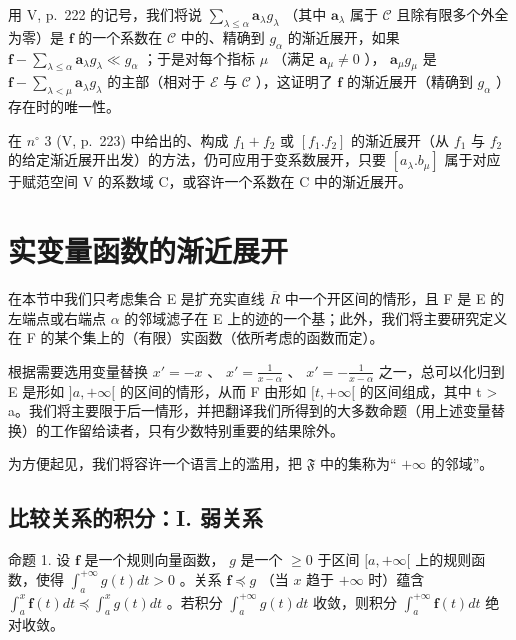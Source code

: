 用 V, p.~222 的记号，我们将说 \(\sum_{\lambda \leqslant \alpha} \mathbf{a}_{\lambda} g_{\lambda}\) （其中 \(\mathbf{a}_{\lambda}\) 属于 \(\mathcal{C}\) 且除有限多个外全为零）是 \(\mathbf{f}\) 的一个系数在 \(\mathcal{C}\) 中的、精确到 \(g_{\alpha}\) 的渐近展开，如果 \(\mathbf{f} - \sum_{\lambda \leqslant \alpha} \mathbf{a}_{\lambda} g_{\lambda} \ll g_{\alpha}\) ；于是对每个指标 \(\mu\) （满足 \(\mathbf{a}_{\mu} \neq 0\) ）， \(\mathbf{a}_{\mu} g_{\mu}\) 是 \(\mathbf{f} - \sum_{\lambda < \mu} \mathbf{a}_{\lambda} g_{\lambda}\) 的主部（相对于 \(\mathcal{E}\) 与 \(\mathcal{C}\) ），这证明了 \(\mathbf{f}\) 的渐近展开（精确到 \(g_{\alpha}\) ）存在时的唯一性。

在 \(n^{\circ}\) 3 (V, p.~223) 中给出的、构成 \(f_{1} + f_{2}\) 或 \([f_{1}.f_{2}]\) 的渐近展开（从 \(f_{1}\) 与 \(f_{2}\) 的给定渐近展开出发）的方法，仍可应用于变系数展开，只要 \([a_{\lambda}.b_{\mu}]\) 属于对应于赋范空间 V 的系数域 C，或容许一个系数在 C 中的渐近展开。

\section{实变量函数的渐近展开}

在本节中我们只考虑集合 E 是扩充实直线 \(\overline{R}\) 中一个开区间的情形，且 F 是 E 的左端点或右端点 \(\alpha\) 的邻域滤子在 E 上的迹的一个基；此外，我们将主要研究定义在 F 的某个集上的（有限）实函数（依所考虑的函数而定）。

根据需要选用变量替换 \(x' = -x\) 、 \(x' = \frac{1}{x - \alpha}\) 、 \(x' = -\frac{1}{x - \alpha}\) 之一，总可以化归到 E 是形如 \(]a, +\infty[\) 的区间的情形，从而 F 由形如 \([t, +\infty[\) 的区间组成，其中 t \textgreater{} a。我们将主要限于后一情形，并把翻译我们所得到的大多数命题（用上述变量替换）的工作留给读者，只有少数特别重要的结果除外。

为方便起见，我们将容许一个语言上的滥用，把 \(\mathfrak{F}\) 中的集称为`` \(+\infty\) 的邻域''。

\subsection{比较关系的积分：I. 弱关系}

命题 1. 设 \(\mathbf{f}\) 是一个规则向量函数， \(g\) 是一个 \(\geqslant 0\) 于区间 \([a, +\infty[\) 上的规则函数，使得 \(\int_{a}^{+\infty} g(t) dt > 0\) 。关系 \(\mathbf{f} \preccurlyeq g\) （当 \(x\) 趋于 \(+\infty\) 时）蕴含 \(\int_{a}^{x} \mathbf{f}(t) dt \preccurlyeq \int_{a}^{x} g(t) dt\) 。若积分 \(\int_{a}^{+\infty} g(t) dt\) 收敛，则积分 \(\int_{a}^{+\infty} \mathbf{f}(t) dt\) 绝对收敛。

